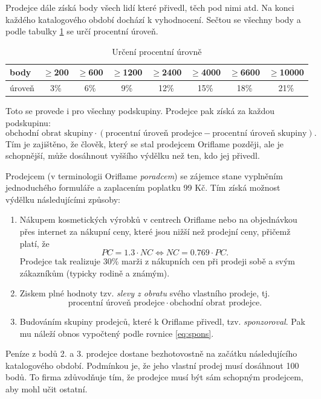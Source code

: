 \documentclass[a4wide,12pt]{report}
\begin{document}
Prodejce dále získá body všech lidí které přivedl, těch pod nimi atd. Na konci každého katalogového období dochází k vyhodnocení. Sečtou se všechny body a podle tabulky \ref{tab:perc_level} se určí procentní úroveň.
\begin{table}[htb]
\begin{center}
\begin{tabular}{|l|c|c|c|c|c|c|c|}
\hline
body & $\geq$200 & $\geq$600 & $\geq$1200 & $\geq$2400 & $\geq$4000 & $\geq$6600& $\geq$10000\\\hline
úroveň & 3\% & 6\% & 9\% & 12\% & 15\% & 18\% & 21\%\\\hline
\end{tabular}
\end{center}
\caption{Určení procentní úrovně}
\label{tab:perc_level}
\end{table}
Toto se provede i pro všechny podskupiny. Prodejce pak získá za každou podskupinu:
\begin{equation} \label{eq:spons}
\text{obchodní obrat skupiny} \cdot (\text{procentní úroveň prodejce} - \text{procentní úroveň skupiny}).
\end{equation}
Tím je zajištěno, že člověk, který se stal prodejcem Oriflame později, ale je schopnější, může dosáhnout vyššího výdělku než ten, kdo jej přivedl.

Prodejcem (v terminologii Oriflame \emph{poradcem}) se zájemce stane vyplněním jednoduchého formuláře a zaplacením poplatku 99 Kč. Tím získá možnost výdělku následujícími způsoby:
\begin{enumerate}
\item Nákupem kosmetických výrobků v centrech Oriflame nebo na objednávkou přes internet za nákupní ceny, které jsou nižší než prodejní ceny, přičemž platí, že
\begin{equation} \label{eq:pcnc}
PC=1.3 \cdot NC \Leftrightarrow NC = 0.769 \cdot PC.
\end{equation}
Prodejce tak realizuje 30\% marži z nákupních cen při prodeji sobě a svým zákazníkům (typicky rodině a známým).
\item Ziskem plné hodnoty tzv. \emph{slevy z obratu} svého vlastního prodeje, tj.
\begin{equation} \label{eq:so}
\text{procentní úroveň prodejce} \cdot \text{obchodní obrat prodejce}.
\end{equation}
\item Budováním skupiny prodejců, které k Oriflame přivedl, tzv. \emph{sponzoroval}. Pak mu náleží obnos vypočtený podle rovnice \ref{eq:spons}.
\end{enumerate}
Peníze z bodů 2. a 3. prodejce dostane bezhotovostně na začátku následujícího katalogového období. Podmínkou je, že jeho vlastní prodej musí dosáhnout 100 bodů. To firma zdůvodňuje tím, že prodejce musí být sám schopným prodejcem, aby mohl učit ostatní.
\end{document}
